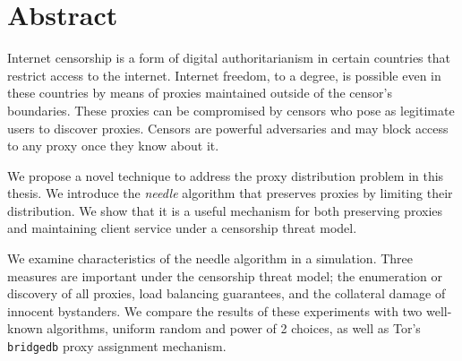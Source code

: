 \chapter{Abstract}
\label{sec:abstract}

Internet censorship is a form of digital authoritarianism in certain countries that restrict access to the internet. Internet freedom, to a degree, is possible even in these countries by means of proxies maintained outside of the censor's boundaries. These proxies can be compromised by censors who pose as legitimate users to discover proxies. Censors are powerful adversaries and may block access to any proxy once they know about it.

We propose a novel technique to address the proxy distribution problem in this thesis. We introduce the \textit{needle} algorithm that preserves proxies by limiting their distribution. We show that it is a useful mechanism for both preserving proxies and maintaining client service under a censorship threat model. 

We examine characteristics of the needle algorithm in a simulation. Three measures are important under the censorship threat model; the enumeration or discovery of all proxies, load balancing guarantees, and the collateral damage of innocent bystanders. We compare the results of these experiments with two well-known algorithms, uniform random and power of 2 choices, as well as Tor's \texttt{bridgedb} proxy assignment mechanism. 